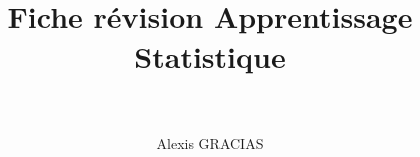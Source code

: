 \documentclass[12pt,french]{report}
\title{
    \HRule \\[0.4cm] \Huge \bfseries 
    Fiche révision Apprentissage Statistique
    \\[0.15cm] \HRule \\[0.4cm]}
\author{\Large Alexis GRACIAS}
\begin{document}
\maketitle

\dominitoc %
\large \tableofcontents
\normalsize %

\renewcommand{\chaptermark}[1]{ \markboth{#1}{} }
\pagestyle{fancy}
\fancyhead{} %
\fancyhead[RO,LE]{\leftmark}
\fancyfoot{} %

\makeatletter
\renewcommand{\@evenfoot}{\makebox[\textwidth][c]{page {\thepage} sur \pageref{LastPage}}}
\renewcommand{\@oddfoot}{\@evenfoot}
\makeatother

\renewcommand{\labelitemi}{$\bullet$}
\renewcommand{\labelitemii}{---}
\renewcommand{\labelitemiii}{-}
\renewcommand{\labelitemiv}{.}





\end{document}
